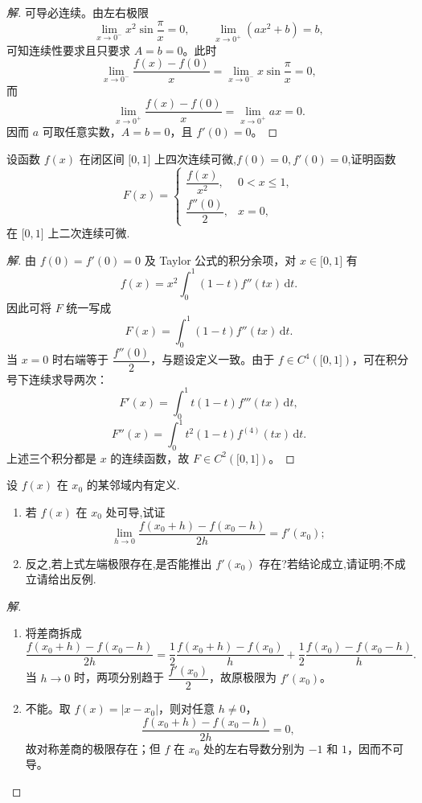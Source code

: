 \documentclass[../../数学分析培优讲义(答案版).tex]{subfiles}
\begin{document}
\begin{proof}[解]
可导必连续。由左右极限
\[
    \lim\limits_{x\to0^-}x^2\sin\dfrac{\pi}{x}=0,
    \qquad
    \lim\limits_{x\to0^+}(ax^2+b)=b,
\]
可知连续性要求且只要求 $A=b=0$。此时
\[
    \lim\limits_{x\to0^-}\dfrac{f(x)-f(0)}{x}
    =\lim\limits_{x\to0^-}x\sin\dfrac{\pi}{x}=0,
\]
而
\[
    \lim\limits_{x\to0^+}\dfrac{f(x)-f(0)}{x}
    =\lim\limits_{x\to0^+}ax=0.
\]
因而 $a$ 可取任意实数，$A=b=0$，且 $f'(0)=0$。
\end{proof}

\begin{example}
设函数 $f(x)$ 在闭区间 $\lbrack 0,1\rbrack$ 上四次连续可微,$f(0)=0,f'(0)=0$,证明函数
\[
F(x)=
\begin{cases}
    \dfrac{f(x)}{x^2}, & 0<x\leq1,\\
    \dfrac{f''(0)}{2}, & x=0,
\end{cases}
\]
在 $\lbrack 0,1\rbrack$ 上二次连续可微.
\end{example}

\begin{proof}[解]
由 $f(0)=f'(0)=0$ 及 Taylor 公式的积分余项，对 $x\in\lbrack0,1\rbrack$ 有
\[
    f(x)=x^2\int_0^1(1-t)f''(tx)\,\mathrm{d}t.
\]
因此可将 $F$ 统一写成
\[
    F(x)=\int_0^1(1-t)f''(tx)\,\mathrm{d}t.
\]
当 $x=0$ 时右端等于 $\dfrac{f''(0)}{2}$，与题设定义一致。由于 $f\in C^4(\lbrack0,1\rbrack)$，可在积分号下连续求导两次：
\[
    F'(x)=\int_0^1t(1-t)f'''(tx)\,\mathrm{d}t,
\]
\[
    F''(x)=\int_0^1t^2(1-t)f^{(4)}(tx)\,\mathrm{d}t.
\]
上述三个积分都是 $x$ 的连续函数，故 $F\in C^2(\lbrack0,1\rbrack)$。
\end{proof}

\begin{example}
设 $f(x)$ 在 $x_0$ 的某邻域内有定义.
\begin{enumerate}[label=(\arabic*)]
    \item 若 $f(x)$ 在 $x_0$ 处可导,试证
    \[
        \lim\limits_{h\to0}
        \dfrac{f(x_0+h)-f(x_0-h)}{2h}=f'(x_0);
    \]
    \item 反之,若上式左端极限存在,是否能推出 $f'(x_0)$ 存在?若结论成立,请证明;不成立请给出反例.
\end{enumerate}
\end{example}

\begin{proof}[解]
\begin{enumerate}[label=(\arabic*)]
    \item 将差商拆成
    \[
        \dfrac{f(x_0+h)-f(x_0-h)}{2h}
        =\dfrac{1}{2}\dfrac{f(x_0+h)-f(x_0)}{h}
        +\dfrac{1}{2}\dfrac{f(x_0)-f(x_0-h)}{h}.
    \]
    当 $h\to0$ 时，两项分别趋于 $\dfrac{f'(x_0)}{2}$，故原极限为 $f'(x_0)$。
    \item 不能。取 $f(x)=|x-x_0|$，则对任意 $h\neq0$，
    \[
        \dfrac{f(x_0+h)-f(x_0-h)}{2h}=0,
    \]
    故对称差商的极限存在；但 $f$ 在 $x_0$ 处的左右导数分别为 $-1$ 和 $1$，因而不可导。
\end{enumerate}
\end{proof}
\end{document}
